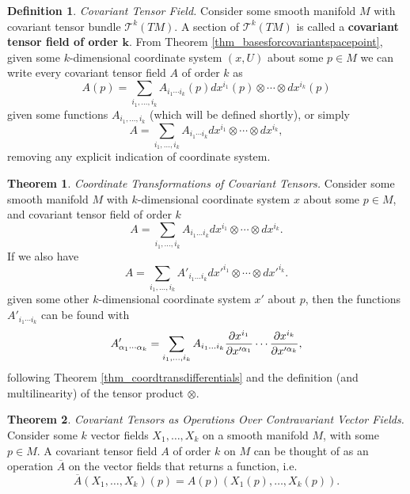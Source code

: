 \documentclass[10pt,landscape]{article}
\theoremstyle{definition}
\newtheorem{definition}{Definition}[section]
\theoremstyle{theorem}
\newtheorem{theorem}{Theorem}[section]
\theoremstyle{summary}
\theoremstyle{remark}
\begin{document}
\begin{multicols*}{3}
\theoremstyle{definition}
\begin{definition}{\textit{Covariant Tensor Field.}}
    Consider some smooth manifold $M$ with covariant tensor bundle $\mathcal{T}^k(TM)$. A section of $\mathcal{T}^k(TM)$ is called a \textbf{covariant tensor field of order $\bm{k}$}. From Theorem \ref{thm_basesforcovariantspacepoint}, given some $k$-dimensional coordinate system $(x ,U)$ about some $p\in M$ we can write every covariant tensor field $A$ of order $k$ as
    \begin{equation}
        A(p) = \sum\limits_{i_1,\ldots,i_k}A_{i_1\cdots i_k}(p)dx^{i_1}(p)\otimes\cdots\otimes dx^{i_k}(p)
    \end{equation}
    given some functions $A_{i_1,\ldots,i_k}$ (which will be defined shortly), or simply
    \begin{equation}
        A = \sum\limits_{i_1,\ldots,i_k}A_{i_1\cdots i_k}dx^{i_1}\otimes\cdots\otimes dx^{i_k},
    \end{equation}
    removing any explicit indication of coordinate system.
\end{definition}

\theoremstyle{theorem}
\begin{theorem}{\textit{Coordinate Transformations of Covariant Tensors.}}
    Consider some smooth manifold $M$ with $k$-dimensional coordinate system $x$ about some $p\in M$, and covariant tensor field of order $k$
    \begin{equation}
        A = \sum\limits_{i_1,\ldots,i_k}A_{i_1\ldots i_k}dx^{i_1}\otimes\cdots\otimes dx^{i_k}.
    \end{equation}
    If we also have
    \begin{equation}
        A = \sum\limits_{i_1,\ldots,i_k}A'_{i_1\ldots i_k}dx'^{i_1}\otimes\cdots\otimes dx'^{i_k}.
    \end{equation}
    given some other $k$-dimensional coordinate system $x'$ about $p$, then the functions $A'_{i_1\cdots i_k}$ can be found with
    \begin{equation}
        A'_{\alpha_1\cdots\alpha_k} = \sum\limits_{i_1,\ldots,i_k}A_{i_1\ldots i_k} \pdv{x^{i_1}}{x'^{\alpha_1}}\cdots\pdv{x^{i_k}}{x'^{\alpha_k}},
    \end{equation}
    following Theorem \ref{thm_coordtransdifferentials} and the definition (and multilinearity) of the tensor product $\otimes$.
\end{theorem}

\theoremstyle{theorem}
\begin{theorem}{\textit{Covariant Tensors as Operations Over Contravariant Vector Fields.}}
    Consider some $k$ vector fields $X_1,\ldots,X_k$ on a smooth manifold $M$, with some $p\in M$. A covariant tensor field $A$ of order $k$ on $M$ can be thought of as an operation $\overline{A}$ on the vector fields that returns a function, i.e.
    \begin{equation}
        \overline{A}(X_1,\ldots,X_k)(p) = A(p)(X_1(p),\ldots,X_k(p)).
    \end{equation}
    

\end{theorem}
\end{multicols*}
\end{document}
